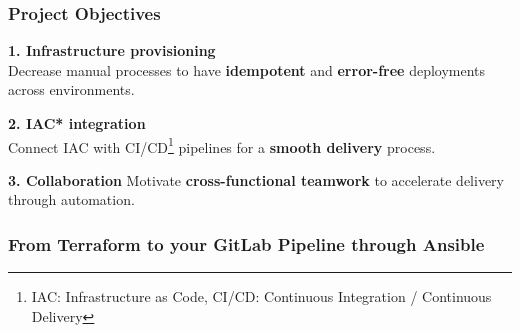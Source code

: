 \documentclass{beamer}
\begin{document}
\begin{frame}
\frametitle{Project Objectives}

\begin{tcolorbox}[colframe=cyan!30, colback=white, arc=3mm, boxrule=0.6pt,
  left=2mm, right=2mm, top=1mm, bottom=1mm, width=\textwidth]
  \textbf{1. Infrastructure provisioning} \\
  \vspace{0.4em}
  Decrease manual processes to have \textbf{idempotent} and \textbf{error-free} deployments across environments.
\end{tcolorbox}

\vspace{0.3em}

\begin{tcolorbox}[colframe=cyan!30, colback=white, arc=3mm, boxrule=0.6pt,
  left=2mm, right=2mm, top=1mm, bottom=1mm, width=\textwidth]
  \textbf{2. IAC* integration} \\
  \vspace{0.4em}
  Connect IAC with CI/CD\footnote{IAC: Infrastructure as Code, CI/CD: Continuous Integration / Continuous Delivery} pipelines for a \textbf{smooth delivery} process.
\end{tcolorbox}

\vspace{0.3em}

\begin{tcolorbox}[colframe=cyan!30, colback=white, arc=3mm, boxrule=0.6pt,
  left=2mm, right=2mm, top=1mm, bottom=1mm, width=\textwidth]
  \textbf{3. Collaboration} \vspace{0.4em} Motivate \textbf{ cross-functional teamwork} to accelerate delivery through automation.
\end{tcolorbox}
\end{frame}

\begin{frame}
\frametitle{From Terraform to your GitLab Pipeline through Ansible}
\end{frame}
\end{document}
